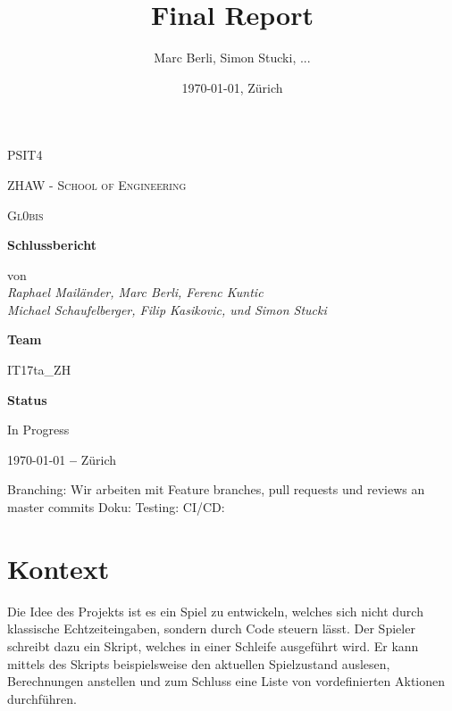\documentclass[a4paper, 11pt]{scrartcl}
\title{Final Report}
\author{Marc Berli, Simon Stucki, ...}
\date{\today{}, Zürich}
\let\oldsection\section
\renewcommand\section{\clearpage\oldsection}
\begin{document}
\begin{titlepage}
\centering
{\scshape\LARGE PSIT4 \par}
\vspace{1cm}
{\scshape ZHAW - School of Engineering\par}
\vspace{1cm}
{\scshape\Large Gl0bis\par}
\vspace{1.5cm}
{\huge\bfseries Schlussbericht\par}
\vspace{2cm}
von
\vspace{1em}
\Large\itshape \\ Raphael Mailänder, Marc Berli, Ferenc Kuntic \\ Michael Schaufelberger, Filip Kasikovic, und Simon Stucki\par
\vfill
\textbf{Team}\par
IT17ta\_ZH\par
\vspace{2em}
\textbf{Status}\par
In Progress

\vfill

{\large \today \textbf{ --} Zürich\par}
\end{titlepage}

\tableofcontents

\newpage

\FirstSprintPoints
Branching: Wir arbeiten mit Feature branches, pull requests und reviews an master commits
Doku:
Testing:
CI/CD:

\section{Kontext}

Die Idee des Projekts ist es ein Spiel zu entwickeln,
welches sich nicht durch klassische Echtzeiteingaben,
sondern durch Code steuern lässt.
Der Spieler schreibt dazu ein Skript,
welches in einer Schleife ausgeführt wird.
Er kann mittels des Skripts beispielsweise den aktuellen Spielzustand auslesen,
Berechnungen anstellen und zum Schluss eine Liste von vordefinierten Aktionen durchführen.
\end{document}
